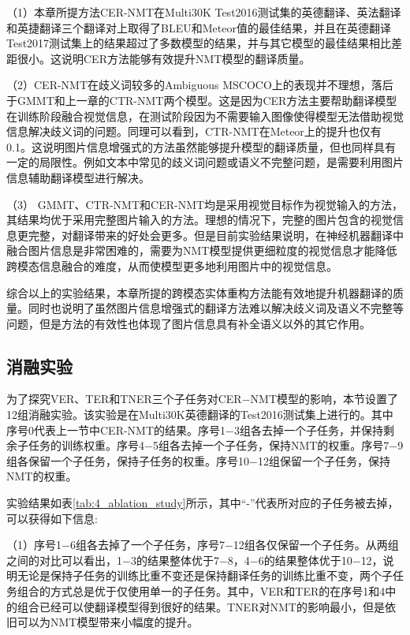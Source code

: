 （1）本章所提方法CER-NMT在Multi30K Test2016测试集的英德翻译、英法翻译和英捷翻译三个翻译对上取得了BLEU和Meteor值的最佳结果，并且在英德翻译Test2017测试集上的结果超过了多数模型的结果，并与其它模型的最佳结果相比差距很小。这说明CER方法能够有效提升NMT模型的翻译质量。

（2）CER-NMT在歧义词较多的Ambiguous MSCOCO上的表现并不理想，落后于GMMT和上一章的CTR-NMT两个模型。这是因为CER方法主要帮助翻译模型在训练阶段融合视觉信息，在测试阶段因为不需要输入图像使得模型无法借助视觉信息解决歧义词的问题。同理可以看到，CTR-NMT在Meteor上的提升也仅有0.1。这说明图片信息增强式的方法虽然能够提升模型的翻译质量，但也同样具有一定的局限性。例如文本中常见的歧义词问题或语义不完整问题，是需要利用图片信息辅助翻译模型进行解决。

（3）%
GMMT、CTR-NMT和CER-NMT均是采用视觉目标作为视觉输入的方法，其结果均优于采用完整图片输入的方法。理想的情况下，完整的图片包含的视觉信息更完整，对翻译带来的好处会更多。但是目前实验结果说明，在神经机器翻译中融合图片信息是非常困难的，需要为NMT模型提供更细粒度的视觉信息才能降低跨模态信息融合的难度，从而使模型更多地利用图片中的视觉信息。

综合以上的实验结果，本章所提的跨模态实体重构方法能有效地提升机器翻译的质量。同时也说明了虽然图片信息增强式的翻译方法难以解决歧义词及语义不完整等问题，但是方法的有效性也体现了图片信息具有补全语义以外的其它作用。

\subsection{消融实验}
\label{sec:4_ablation_study}
为了探究VER、TER和TNER三个子任务对CER$-$NMT模型的影响，本节设置了12组消融实验。该实验是在Multi30K英德翻译的Test2016测试集上进行的。其中序号0代表上一节中CER-NMT的结果。序号1$-$3组各去掉一个子任务，并保持剩余子任务的训练权重。序号4$-$5组各去掉一个子任务，保持NMT的权重。序号7$-$9组各保留一个子任务，保持子任务的权重。序号10$-$12组保留一个子任务，保持NMT的权重。


实验结果如表\ref{tab:4_ablation_study}所示，其中“-”代表所对应的子任务被去掉，可以获得如下信息:

（1）序号1$-$6组各去掉了一个子任务，序号7$-$12组各仅保留一个子任务。从两组之间的对比可以看出，1$-$3的结果整体优于7$-$8，4$-$6的结果整体优于10$-$12，说明无论是保持子任务的训练比重不变还是保持翻译任务的训练比重不变，两个子任务组合的方式总是优于仅使用单一的子任务。其中，VER和TER的在序号1和4中的组合已经可以使翻译模型得到很好的结果。TNER对NMT的影响最小，但是依旧可以为NMT模型带来小幅度的提升。


